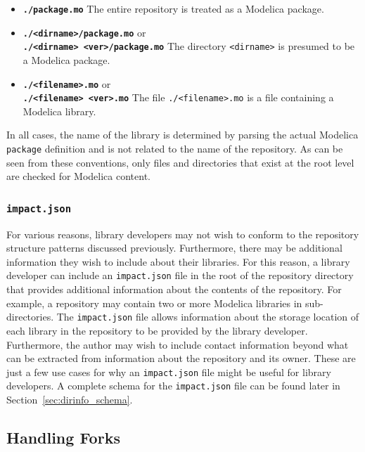\documentclass[11pt,a4paper,twocolumn]{article}
\newcommand{\code}[1]{\texttt{#1}} %
\begin{document}
\begin{itemize}[noitemsep]
  \item \textbf{\code{./package.mo}} The entire repository is treated as a Modelica
    package.

  \item \textbf{\code{./<dirname>/package.mo}} or\\  \textbf{\code{./<dirname>
      <ver>/package.mo}} The directory \code{<dirname>} is presumed to
    be a Modelica package.

  \item \textbf{\code{./<filename>.mo}} or\\ \textbf{\code{./<filename> <ver>.mo}} The
    file \code{./<filename>.mo} is a file containing a Modelica
    library.
\end{itemize}

In all cases, the name of the library is determined by parsing the
actual Modelica \code{package} definition and is not related to the
name of the repository.  As can be seen from these conventions, only
files and directories that exist at the root level are checked for
Modelica content.

\subsubsection{\code{impact.json}}
\label{sec:dirinfo}

For various reasons, library developers may not wish to conform to the
repository structure patterns discussed previously.  Furthermore, there
may be additional information they wish to include about their
libraries.  For this reason, a library developer can include an
\code{impact.json} file in the root of the repository directory that
provides additional information about the contents of the repository.
For example, a repository may contain two or more Modelica libraries
in sub-directories.  The \code{impact.json} file allows information
about the storage location of each library in the repository to be
provided by the library developer.  Furthermore, the author may wish
to include contact information beyond what can be extracted from
information about the repository and its owner.  These are just a few
use cases for why an \code{impact.json} file might be useful for
library developers.  A complete schema for the \code{impact.json} file
can be found later in Section~\ref{sec:dirinfo_schema}.

\subsection{Handling Forks}
\end{document}
